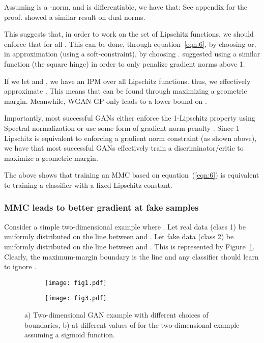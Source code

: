 \documentclass{article}
\def\eqref#1{equation~\ref{#1}}
\begin{document}
Assuming  is a -norm,  and  is differentiable, we have that:
 See appendix for the proof. \citet{adler2018banach} showed a similar result on dual norms. 

This suggests that, in order to work on the set of Lipschitz functions, we should enforce that  for all .
This can be done, through \eqref{eqn:6}, by choosing  or, in approximation (using a soft-constraint), by choosing . \citet{petzka2017regularization} suggested using a similar function (the square hinge) in order to only penalize gradient norms above 1.

If we let  and , we have an IPM over all Lipschitz functions. thus, we effectively approximate . This means that  can be found through maximizing a geometric margin. Meanwhile, WGAN-GP only leads to a lower bound on .

Importantly, most successful GANs \citep{brock2018large,karras2019style,karras2017progressive} either enforce the 1-Lipschitz property using Spectral normalization \citep{miyato2018spectral} or use some form of gradient norm penalty \citep{WGAN-GP,mescheder2018training}. Since 1-Lipschitz is equivalent to enforcing a gradient norm constraint (as shown above), we have that most successful GANs effectively train a discriminator/critic to maximize a geometric margin.

The above shows that training an MMC based on equation~(\ref{eqn:6}) is equivalent to training a classifier with a fixed Lipschitz constant.

\subsubsection{MMC leads to better gradient at fake samples}

Consider a simple two-dimensional example where . Let real data (class 1) be uniformly distributed on the line between  and . Let fake data (class 2) be uniformly distributed on the line between  and . This is represented by Figure~\ref{fig:fig1}.  Clearly, the maximum-margin boundary is the line  and any classifier should learn to ignore . 

\begin{figure}[!ht]
	\centering
	\begin{subfigure}[t]{0.5\textwidth}
    	\centering\texttt{[image: fig1.pdf]}
    	\caption{}
    	\label{fig:fig1}
	\end{subfigure}\begin{subfigure}[t]{0.5\textwidth}
    	\centering\texttt{[image: fig3.pdf]}
    	\caption{}
    	\label{fig:fig2}
	\end{subfigure}
	\caption{a) Two-dimensional GAN example with different choices of boundaries, b)  at different values of  for the two-dimensional example assuming a sigmoid function.}
\end{figure}
\end{document}
